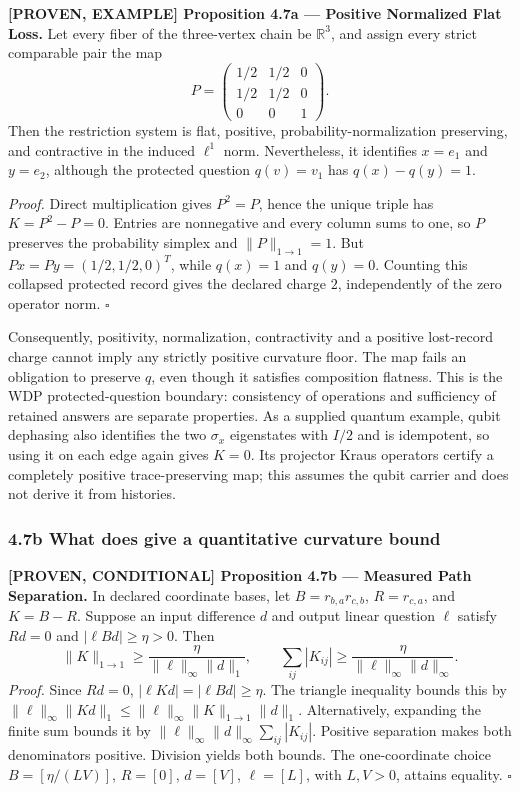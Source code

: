 \documentclass[
  english,
  10pt,
  a4paper,
]{article}
\renewenvironment{quote}
  {\begin{leftbar}\small}
  {\end{leftbar}}
\begin{document}
\begin{quote}
\textbf{{[}PROVEN, EXAMPLE{]} Proposition 4.7a --- Positive Normalized
Flat Loss.} Let every fiber of the three-vertex chain be
\(\mathbb R^3\), and assign every strict comparable pair the map \[
P=\begin{pmatrix}1/2&1/2&0\\1/2&1/2&0\\0&0&1\end{pmatrix}.
\] Then the restriction system is flat, positive,
probability-normalization preserving, and contractive in the induced
\(\ell^1\) norm. Nevertheless, it identifies \(x=e_1\) and \(y=e_2\),
although the protected question \(q(v)=v_1\) has \(q(x)-q(y)=1\).

\emph{Proof.} Direct multiplication gives \(P^2=P\), hence the unique
triple has \(K=P^2-P=0\). Entries are nonnegative and every column sums
to one, so \(P\) preserves the probability simplex and
\(\|P\|_{1\to1}=1\). But \(Px=Py=(1/2,1/2,0)^T\), while \(q(x)=1\) and
\(q(y)=0\). Counting this collapsed protected record gives the declared
charge \(2\), independently of the zero operator norm. \(\square\)
\end{quote}

Consequently, positivity, normalization, contractivity and a positive
lost-record charge cannot imply any strictly positive curvature floor.
The map fails an obligation to preserve \(q\), even though it satisfies
composition flatness. This is the WDP protected-question boundary:
consistency of operations and sufficiency of retained answers are
separate properties. As a supplied quantum example, qubit dephasing also
identifies the two \(\sigma_x\) eigenstates with \(I/2\) and is
idempotent, so using it on each edge again gives \(K=0\). Its projector
Kraus operators certify a completely positive trace-preserving map; this
assumes the qubit carrier and does not derive it from histories.

\subsubsection{4.7b What does give a quantitative curvature
bound}\label{b-what-does-give-a-quantitative-curvature-bound}

\begin{quote}
\textbf{{[}PROVEN, CONDITIONAL{]} Proposition 4.7b --- Measured Path
Separation.} In declared coordinate bases, let \(B=r_{b,a}r_{c,b}\),
\(R=r_{c,a}\), and \(K=B-R\). Suppose an input difference \(d\) and
output linear question \(\ell\) satisfy \(Rd=0\) and
\(|\ell Bd|\ge\eta>0\). Then \[
\|K\|_{1\to1}\ge\frac{\eta}{\|\ell\|_\infty\|d\|_1},\qquad
\sum_{ij}|K_{ij}|\ge\frac{\eta}{\|\ell\|_\infty\|d\|_\infty}.
\] \emph{Proof.} Since \(Rd=0\), \(|\ell Kd|=|\ell Bd|\ge\eta\). The
triangle inequality bounds this by
\(\|\ell\|_\infty\|Kd\|_1\le\|\ell\|_\infty\|K\|_{1\to1}\|d\|_1\).
Alternatively, expanding the finite sum bounds it by
\(\|\ell\|_\infty\|d\|_\infty\sum_{ij}|K_{ij}|\). Positive separation
makes both denominators positive. Division yields both bounds. The
one-coordinate choice \(B=[\eta/(LV)]\), \(R=[0]\), \(d=[V]\),
\(\ell=[L]\), with \(L,V>0\), attains equality. \(\square\)
\end{quote}
\end{document}

